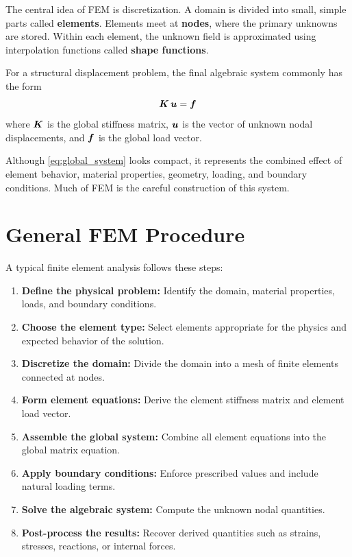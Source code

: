 The central idea of FEM is discretization. A domain is divided into small,
simple parts called \textbf{elements}. Elements meet at \textbf{nodes}, where the
primary unknowns are stored. Within each element, the unknown field is
approximated using interpolation functions called \textbf{shape functions}.

For a structural displacement problem, the final algebraic system commonly has
the form
\begin{equation}
    \bm{K} \, \bm{u} = \bm{f}
    \label{eq:global_system}
\end{equation}
where $\bm{K}$ is the global stiffness matrix, $\bm{u}$ is the vector of
unknown nodal displacements, and $\bm{f}$ is the global load vector.

Although \cref{eq:global_system} looks compact, it represents the combined
effect of element behavior, material properties, geometry, loading, and boundary
conditions. Much of FEM is the careful construction of this system.

\section{General FEM Procedure}

A typical finite element analysis follows these steps:

\begin{enumerate}
    \item \textbf{Define the physical problem:} Identify the domain, material
    properties, loads, and boundary conditions.
    \item \textbf{Choose the element type:} Select elements appropriate for the
    physics and expected behavior of the solution.
    \item \textbf{Discretize the domain:} Divide the domain into a mesh of
    finite elements connected at nodes.
    \item \textbf{Form element equations:} Derive the element stiffness matrix
    and element load vector.
    \item \textbf{Assemble the global system:} Combine all element equations
    into the global matrix equation.
    \item \textbf{Apply boundary conditions:} Enforce prescribed values and
    include natural loading terms.
    \item \textbf{Solve the algebraic system:} Compute the unknown nodal
    quantities.
    \item \textbf{Post-process the results:} Recover derived quantities such as
    strains, stresses, reactions, or internal forces.
\end{enumerate}


